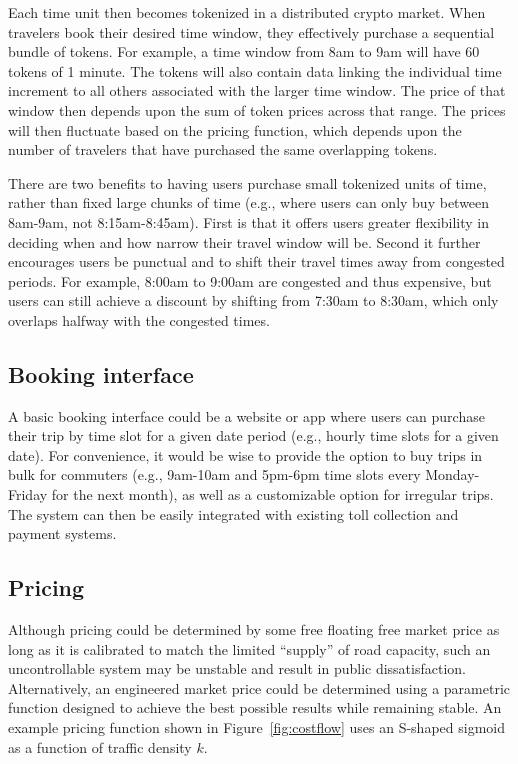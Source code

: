 \documentclass{article}
\begin{document}
Each time unit then becomes tokenized in a distributed crypto market. When travelers book their desired time window, they effectively purchase a sequential bundle of tokens. For example, a time window from 8am to 9am will have 60 tokens of 1 minute. The tokens will also contain data linking the individual time increment to all others associated with the larger time window. The price of that window then depends upon the sum of token prices across that range. The prices will then fluctuate based on the pricing function, which depends upon the number of travelers that have purchased the same overlapping tokens.

There are two benefits to having users purchase small tokenized units of time, rather than fixed large chunks of time (e.g., where users can only buy between 8am-9am, not 8:15am-8:45am). First is that it offers users greater flexibility in deciding when and how narrow their travel window will be. Second it further encourages users be punctual and to shift their travel times away from congested periods. For example, 8:00am to 9:00am are congested and thus expensive, but users can still achieve a discount by shifting from 7:30am to 8:30am, which only overlaps halfway with the congested times.

\subsection{Booking interface}
A basic booking interface could be a website or app where users can purchase their trip by time slot for a given date period (e.g., hourly time slots for a given date). For convenience, it would be wise to provide the option to buy trips in bulk for commuters (e.g., 9am-10am and 5pm-6pm time slots every Monday-Friday for the next month), as well as a customizable option for irregular trips. The system can then be easily integrated with existing toll collection and payment systems.

\subsection{Pricing}
Although pricing could be determined by some free floating free market price as long as it is calibrated to match the limited ``supply'' of road capacity, such an uncontrollable system may be unstable and result in public dissatisfaction. Alternatively, an engineered market price could be determined using a parametric function designed to achieve the best possible results while remaining stable. An example pricing function shown in Figure~\ref{fig:costflow} uses an S-shaped sigmoid as a function of traffic density $k$. 
\end{document}
